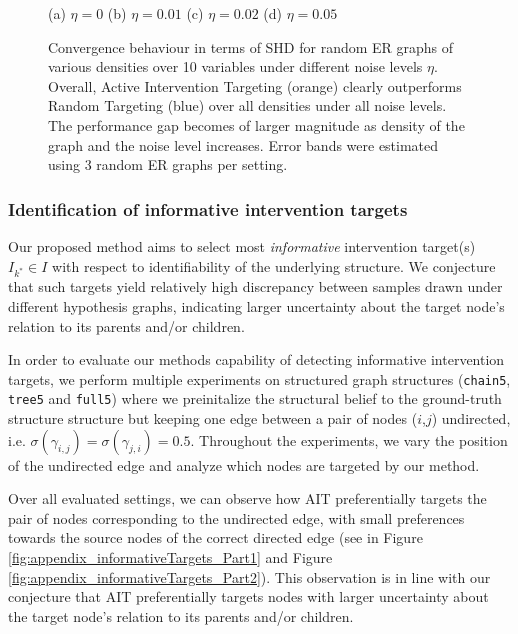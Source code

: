 \documentclass[nohyperref]{article}
\theoremstyle{plain}
\theoremstyle{definition}
\theoremstyle{remark}
\begin{document}
\begin{figure}[h!]
        \centering
        \qquad
    \endminipage\hfill
        \centering
        (a) $\eta = 0$
    \endminipage\hfill
        \centering
        (b) $\eta = 0.01$
    \endminipage\hfill
        \centering
        (c) $\eta = 0.02$
    \endminipage\hfill
        \centering
        (d) $\eta = 0.05$
    \endminipage\hfill
    \caption{Convergence behaviour in terms of SHD for random ER graphs of various densities over 10 variables under different noise levels $\eta$. Overall, Active Intervention Targeting (orange) clearly outperforms Random Targeting (blue) over all densities under all noise levels. The performance gap becomes of larger magnitude as density of the graph and the noise level increases. Error bands were estimated using 3 random ER graphs per setting.}
   \label{fig:dsdi_noise_speed_ER_various}
\end{figure}


\clearpage
\subsubsection{Identification of informative intervention targets}
\label{app:ablation_informativeTargets}
Our proposed method aims to select most \textit{informative} intervention target(s) $I_{k^*} \in I$ with respect to identifiability of the underlying structure. We conjecture that such targets yield relatively high discrepancy between samples drawn under different hypothesis graphs, indicating larger uncertainty about the target node's relation to its parents and/or children. 

In order to evaluate our methods capability of detecting informative intervention targets, we perform multiple experiments on structured graph structures (\texttt{chain5}, \texttt{tree5} and \texttt{full5}) where we preinitalize the structural belief to the ground-truth structure structure but keeping one edge between a pair of nodes ($i$,$j$) undirected, i.e. $\sigma(\gamma_{i,j}) = \sigma(\gamma_{j,i}) = 0.5$. Throughout the experiments, we vary the position of the undirected edge and analyze which nodes are targeted by our method.

Over all evaluated settings, we can observe how AIT preferentially targets the pair of nodes corresponding to the undirected edge, with small preferences towards the source nodes of the correct directed edge (see in Figure \ref{fig:appendix_informativeTargets_Part1} and Figure \ref{fig:appendix_informativeTargets_Part2}). This observation is in line with our conjecture that AIT preferentially targets nodes with larger uncertainty about the target node's relation to its parents and/or children. 
\end{document}
